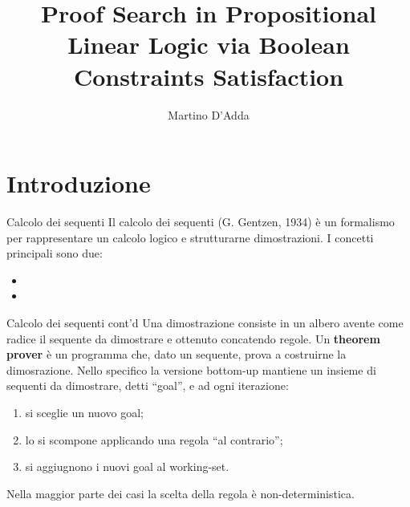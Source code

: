 \documentclass{beamer}
\title{Proof Search in Propositional Linear Logic via Boolean Constraints Satisfaction}
\author{Martino D'Adda}
\begin{document}
\maketitle


\section{Introduzione}
\begin{frame}{Calcolo dei sequenti}
	Il calcolo dei sequenti (G. Gentzen, 1934) è un formalismo per rappresentare un calcolo logico e strutturarne dimostrazioni.
	I concetti principali sono due:
	\begin{itemize}
		\item {}
		\item {}
	\end{itemize}
\end{frame}

\begin{frame}{Calcolo dei sequenti cont'd}
	Una dimostrazione consiste in un albero avente come radice il sequente da dimostrare e ottenuto concatendo regole.
	Un \textbf{theorem prover} è un programma che, dato un sequente, prova a costruirne la dimosrazione.
	Nello specifico la versione bottom-up mantiene un insieme di sequenti da dimostrare, detti ``goal'', e ad ogni iterazione:
	\begin{enumerate}
		\item si sceglie un nuovo goal;
		\item lo si scompone applicando una regola ``al contrario'';
		\item si aggiugnono i nuovi goal al working-set.
	\end{enumerate}
	Nella maggior parte dei casi la scelta della regola è non-deterministica.
\end{frame}
\end{document}

